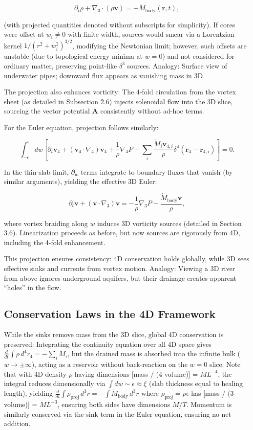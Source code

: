 \documentclass{article}
\begin{document}
\[
\partial_t \rho + \nabla_3 \cdot (\rho \mathbf{v}) = - \dot{M}_{\text{body}}(\mathbf{r}, t),
\]

(with projected quantities denoted without subscripts for simplicity). If cores were offset at $w_i \neq 0$ with finite width, sources would smear via a Lorentzian kernel $1/(r^2 + w_i^2)^{3/2}$, modifying the Newtonian limit; however, such offsets are unstable (due to topological energy minima at $w=0$) and not considered for ordinary matter, preserving point-like $\delta^3$ sources. Analogy: Surface view of underwater pipes; downward flux appears as vanishing mass in 3D.

The projection also enhances vorticity: The 4-fold circulation from the vortex sheet (as detailed in Subsection 2.6) injects solenoidal flow into the 3D slice, sourcing the vector potential $\mathbf{A}$ consistently without ad-hoc terms.

For the Euler equation, projection follows similarly:

\[
\int_{-\epsilon}^{\epsilon} dw \left[ \partial_t \mathbf{v}_4 + (\mathbf{v}_4 \cdot \nabla_4) \mathbf{v}_4 + \frac{1}{\rho} \nabla_4 P + \sum_i \frac{\dot{M}_i \mathbf{v}_{4,i}}{\rho} \delta^4(\mathbf{r}_4 - \mathbf{r}_{4,i}) \right] = 0.
\]

In the thin-slab limit, $\partial_w$ terms integrate to boundary fluxes that vanish (by similar arguments), yielding the effective 3D Euler:

\[
\partial_t \mathbf{v} + (\mathbf{v} \cdot \nabla_3) \mathbf{v} = -\frac{1}{\rho} \nabla_3 P - \frac{\dot{M}_{\text{body}} \mathbf{v}}{\rho},
\]

where vortex braiding along $w$ induces 3D vorticity sources (detailed in Section 3.6). Linearization proceeds as before, but now sources are rigorously from 4D, including the 4-fold enhancement.

This projection ensures consistency: 4D conservation holds globally, while 3D sees effective sinks and currents from vortex motion. Analogy: Viewing a 3D river from above ignores underground aquifers, but their drainage creates apparent ``holes'' in the flow.

\subsection{Conservation Laws in the 4D Framework}

While the sinks remove mass from the 3D slice, global 4D conservation is preserved: Integrating the continuity equation over all 4D space gives $\frac{d}{dt} \int \rho \, d^4 r_4 = -\sum_i \dot{M}_i$, but the drained mass is absorbed into the infinite bulk ($w \to \pm \infty$), acting as a reservoir without back-reaction on the $w=0$ slice. Note that with 4D density $\rho$ having dimensions [mass / (4-volume)] = $M L^{-4}$, the integral reduces dimensionally via $\int dw \sim \epsilon \approx \xi$ (slab thickness equal to healing length), yielding $\frac{d}{dt} \int \rho_{\text{proj}} \, d^3 r = -\int \dot{M}_{\text{body}} \, d^3 r$ where $\rho_{\text{proj}} = \rho \epsilon$ has [mass / (3-volume)] = $M L^{-3}$, ensuring both sides have dimensions $M / T$. Momentum is similarly conserved via the sink term in the Euler equation, ensuring no net addition.
\end{document}

